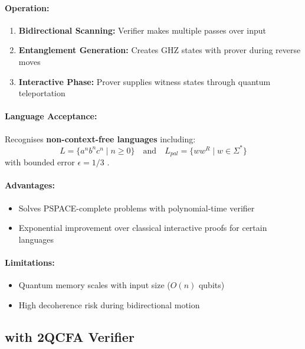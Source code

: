 \paragraph{Operation:}
\begin{enumerate}
    \item \textbf{Bidirectional Scanning:} Verifier makes multiple passes over input
    \item \textbf{Entanglement Generation:} Creates GHZ states with prover during reverse moves
    \item \textbf{Interactive Phase:} Prover supplies witness states through quantum teleportation
\end{enumerate}

\paragraph{Language Acceptance:}
Recognises \textbf{non-context-free languages} including:
\[
L = \{a^nb^nc^n \mid n \geq 0\} \quad \text{and} \quad L_{pal} = \{ww^R \mid w \in \Sigma^*\}
\]
with bounded error $\epsilon = 1/3$ \cite{zheng2012two}.

\paragraph{Advantages:}
\begin{itemize}
    \item Solves PSPACE-complete problems with polynomial-time verifier
    \item Exponential improvement over classical interactive proofs for certain languages
\end{itemize}

\paragraph{Limitations:}
\begin{itemize}
    \item Quantum memory scales with input size ($O(n)$ qubits)
    \item High decoherence risk during bidirectional motion
\end{itemize}

\subsection{ with 2QCFA Verifier}
\label{subsec:qmip2qcfa}

